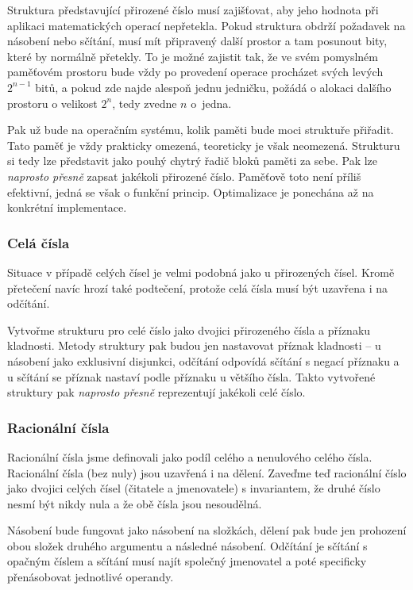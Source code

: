 Struktura představující přirozené číslo musí zajišťovat, aby jeho hodnota při aplikaci matematických operací nepřetekla. Pokud struktura obdrží požadavek na násobení nebo sčítání, musí mít připravený další prostor a tam posunout bity, které by normálně přetekly. To je možné zajistit tak, že ve svém pomyslném paměťovém prostoru bude vždy po provedení operace procházet svých levých $2^{n-1}$ bitů, a pokud zde najde alespoň jednu jedničku, požádá o alokaci dalšího prostoru o velikost $2^n$, tedy zvedne $n$ o~jedna.

Pak už bude na operačním systému, kolik paměti bude moci struktuře přiřadit. Tato paměť je vždy prakticky omezená, teoreticky je však neomezená. Strukturu si tedy lze představit jako pouhý chytrý řadič bloků paměti za sebe. Pak lze \textit{naprosto přesně} zapsat jakékoli přirozené číslo. Paměťově toto není příliš efektivní, jedná se však o funkční princip. Optimalizace je ponechána až na konkrétní implementace.

\subsubsection{Celá čísla}
Situace v případě celých čísel je velmi podobná jako u přirozených čísel. Kromě přetečení navíc hrozí také podtečení, protože celá čísla musí být uzavřena i na odčítání. 

Vytvořme strukturu pro celé číslo jako dvojici přirozeného čísla a příznaku kladnosti. Metody struktury pak budou jen nastavovat příznak kladnosti -- u násobení jako exklusivní disjunkci, odčítání odpovídá sčítání s negací příznaku a u sčítání se příznak nastaví podle příznaku u většího čísla. Takto vytvořené struktury pak \textit{naprosto přesně} reprezentují jakékoli celé číslo.

\subsubsection{Racionální čísla}
Racionální čísla jsme definovali jako podíl celého a nenulového celého čísla. Racionální čísla (bez nuly) jsou uzavřená i na dělení. Zaveďme teď racionální číslo jako dvojici celých čísel (čitatele a jmenovatele) s invariantem, že druhé číslo nesmí být nikdy nula a že obě čísla jsou nesoudělná.

Násobení bude fungovat jako násobení na složkách, dělení pak bude jen prohození obou složek druhého argumentu a následné násobení. Odčítání je sčítání s opačným číslem a sčítání musí najít společný jmenovatel a poté specificky přenásobovat jednotlivé operandy.

